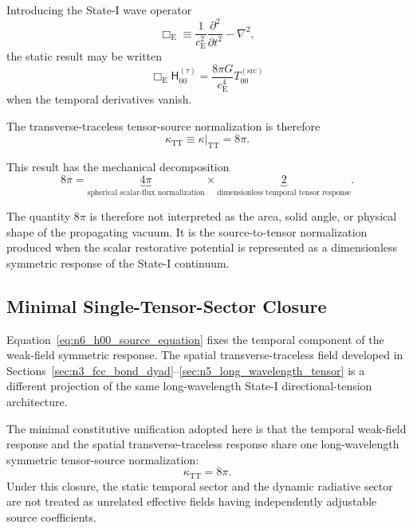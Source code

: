 Introducing the State-I wave operator
\begin{equation}
    \Box_{\mathrm{E}} \equiv \frac{1}{c_{\mathrm{E}}^{2}} \frac{\partial^{2}}{\partial t^{2}} - \nabla^{2},
\end{equation}
the static result may be written
\begin{equation}
    \Box_{\mathrm{E}} \mathsf{H}_{00}^{(\tau)} = \frac{8\pi G}{c_{\mathrm{E}}^{4}} T_{00}^{(\mathrm{src})}
\end{equation}
when the temporal derivatives vanish.

The transverse-traceless tensor-source normalization is therefore
\begin{equation}
    \kappa_{\mathrm{TT}} \equiv \left.\kappa\right|_{\mathrm{TT}} = 8\pi.
    \label{eq:n6_kappa_tensor}
\end{equation}

This result has the mechanical decomposition
\begin{equation}
    8\pi = \underbrace{4\pi}_{\text{spherical scalar-flux normalization}} \times \underbrace{2}_{\text{dimensionless temporal tensor response}}.
    \label{eq:n6_8pi_decomposition}
\end{equation}

The quantity $8\pi$ is therefore not interpreted as the area, solid angle, or physical shape of the propagating vacuum. It is the source-to-tensor normalization produced when the scalar restorative potential is represented as a dimensionless symmetric response of the State-I continuum.

\subsection{Minimal Single-Tensor-Sector Closure}
\label{subsec:n6_single_tensor_sector}

Equation~\eqref{eq:n6_h00_source_equation} fixes the temporal component of the weak-field symmetric response. The spatial transverse-traceless field developed in Sections~\ref{sec:n3_fcc_bond_dyad}--\ref{sec:n5_long_wavelength_tensor} is a different projection of the same long-wavelength State-I directional-tension architecture.

The minimal constitutive unification adopted here is that the temporal weak-field response and the spatial transverse-traceless response share one long-wavelength symmetric tensor-source normalization:
\begin{equation}
    \kappa_{\mathrm{TT}} = 8\pi.
    \label{eq:n6_single_sector_closure}
\end{equation}
Under this closure, the static temporal sector and the dynamic radiative sector are not treated as unrelated effective fields having independently adjustable source coefficients.

